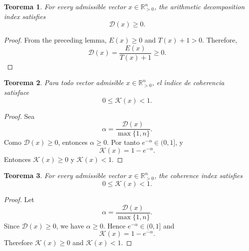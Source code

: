 \documentclass[11pt]{article}
\newtheorem{theorem}{Teorema}
\begin{document}
\begin{theorem}
For every admissible vector $x\in\mathbb{R}_{>0}^n$, the arithmetic decomposition index satisfies
\begin{equation}
\mathcal{D}(x)\ge 0.
\end{equation}
\end{theorem}
\begin{proof}
From the preceding lemma, $E(x)\ge 0$ and $T(x)+1>0$. Therefore,
\begin{equation}
\mathcal{D}(x)=\frac{E(x)}{T(x)+1}\ge 0.
\end{equation}
\end{proof}

\begin{theorem}
Para todo vector admisible $x\in\mathbb{R}_{>0}^n$, el \'{\i}ndice de coherencia satisface
\begin{equation}
0\le \mathcal{K}(x)<1.
\end{equation}
\end{theorem}
\begin{proof}
Sea
\begin{equation}
\alpha = \frac{\mathcal{D}(x)}{\max\{1,n\}}.
\end{equation}
Como $\mathcal{D}(x)\ge 0$, entonces $\alpha\ge 0$. Por tanto $e^{-\alpha}\in (0,1]$, y
\begin{equation}
\mathcal{K}(x)=1-e^{-\alpha}.
\end{equation}
Entonces $\mathcal{K}(x)\ge 0$ y $\mathcal{K}(x)<1$.
\end{proof}

\begin{theorem}
For every admissible vector $x\in\mathbb{R}_{>0}^n$, the coherence index satisfies
\begin{equation}
0\le \mathcal{K}(x)<1.
\end{equation}
\end{theorem}
\begin{proof}
Let
\begin{equation}
\alpha = \frac{\mathcal{D}(x)}{\max\{1,n\}}.
\end{equation}
Since $\mathcal{D}(x)\ge 0$, we have $\alpha\ge 0$. Hence $e^{-\alpha}\in (0,1]$ and
\begin{equation}
\mathcal{K}(x)=1-e^{-\alpha}.
\end{equation}
Therefore $\mathcal{K}(x)\ge 0$ and $\mathcal{K}(x)<1$.
\end{proof}
\end{document}
